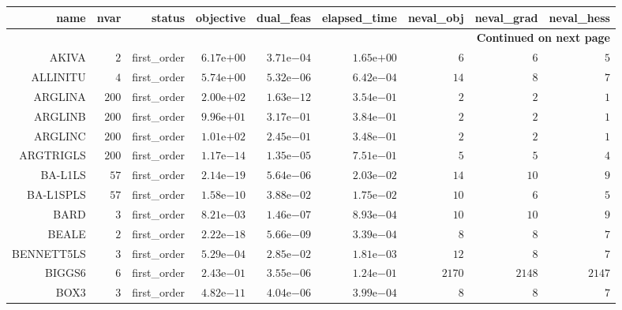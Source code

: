 \begin{longtable}{rrrrrrrrr}
\hline
name & nvar & status & objective & dual\_feas & elapsed\_time & neval\_obj & neval\_grad & neval\_hess \\\hline
\endhead
\hline
\multicolumn{9}{r}{{\bfseries Continued on next page}}\\
\hline
\endfoot
\endlastfoot
AKIVA & \(     2\) & first\_order & \( 6.17\)e\(+00\) & \( 3.71\)e\(-04\) & \( 1.65\)e\(+00\) & \(     6\) & \(     6\) & \(     5\) \\
ALLINITU & \(     4\) & first\_order & \( 5.74\)e\(+00\) & \( 5.32\)e\(-06\) & \( 6.42\)e\(-04\) & \(    14\) & \(     8\) & \(     7\) \\
ARGLINA & \(   200\) & first\_order & \( 2.00\)e\(+02\) & \( 1.63\)e\(-12\) & \( 3.54\)e\(-01\) & \(     2\) & \(     2\) & \(     1\) \\
ARGLINB & \(   200\) & first\_order & \( 9.96\)e\(+01\) & \( 3.17\)e\(-01\) & \( 3.84\)e\(-01\) & \(     2\) & \(     2\) & \(     1\) \\
ARGLINC & \(   200\) & first\_order & \( 1.01\)e\(+02\) & \( 2.45\)e\(-01\) & \( 3.48\)e\(-01\) & \(     2\) & \(     2\) & \(     1\) \\
ARGTRIGLS & \(   200\) & first\_order & \( 1.17\)e\(-14\) & \( 1.35\)e\(-05\) & \( 7.51\)e\(-01\) & \(     5\) & \(     5\) & \(     4\) \\
BA-L1LS & \(    57\) & first\_order & \( 2.14\)e\(-19\) & \( 5.64\)e\(-06\) & \( 2.03\)e\(-02\) & \(    14\) & \(    10\) & \(     9\) \\
BA-L1SPLS & \(    57\) & first\_order & \( 1.58\)e\(-10\) & \( 3.88\)e\(-02\) & \( 1.75\)e\(-02\) & \(    10\) & \(     6\) & \(     5\) \\
BARD & \(     3\) & first\_order & \( 8.21\)e\(-03\) & \( 1.46\)e\(-07\) & \( 8.93\)e\(-04\) & \(    10\) & \(    10\) & \(     9\) \\
BEALE & \(     2\) & first\_order & \( 2.22\)e\(-18\) & \( 5.66\)e\(-09\) & \( 3.39\)e\(-04\) & \(     8\) & \(     8\) & \(     7\) \\
BENNETT5LS & \(     3\) & first\_order & \( 5.29\)e\(-04\) & \( 2.85\)e\(-02\) & \( 1.81\)e\(-03\) & \(    12\) & \(     8\) & \(     7\) \\
BIGGS6 & \(     6\) & first\_order & \( 2.43\)e\(-01\) & \( 3.55\)e\(-06\) & \( 1.24\)e\(-01\) & \(  2170\) & \(  2148\) & \(  2147\) \\
BOX3 & \(     3\) & first\_order & \( 4.82\)e\(-11\) & \( 4.04\)e\(-06\) & \( 3.99\)e\(-04\) & \(     8\) & \(     8\) & \(     7\) \\

\end{longtable}
